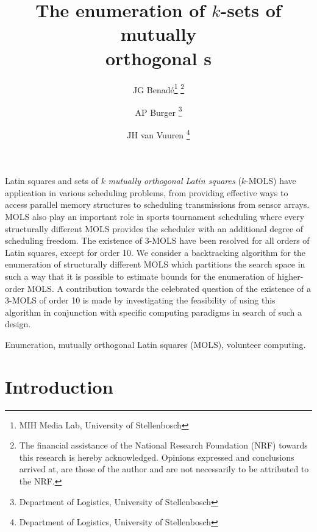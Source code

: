 \documentclass[11pt, a4paper]{article}
\title{The enumeration of $k$-sets of mutually\\ orthogonal  \lat s }
\author{JG Benad\'{e}\thanks{MIH Media Lab, University of Stellenbosch} \thanks{The financial assistance of the National Research Foundation (NRF) towards this research is hereby acknowledged. Opinions
expressed and conclusions arrived at, are those of the author and are not necessarily to be attributed to the NRF.} \and AP Burger \thanks{Department of Logistics, University of Stellenbosch} \and JH van Vuuren \thanks{Department of Logistics, University of Stellenbosch} }
\newcommand{\lat}{Latin square}
\newcounter{ls}
\begin{document}
\oriontitle
\begin{Abstract} 


\lat s and sets of $k$ \emph{mutually orthogonal \lat s} ($k$-MOLS) have  application in various scheduling problems, from providing effective ways to access parallel memory structures to scheduling transmissions from sensor arrays. MOLS  also play an important role in sports tournament scheduling where every structurally different MOLS provides the scheduler with an additional degree of scheduling freedom. The existence of $3$-MOLS have been resolved for all orders of \lat s, except for order 10. We consider a backtracking algorithm for the enumeration of structurally different MOLS which partitions the search space in such a way that it is possible to estimate bounds for the enumeration of higher-order MOLS. A contribution towards the celebrated question of the existence of a 3-MOLS of order 10 is made by investigating the feasibility of using this algorithm in conjunction with  specific computing paradigms in search of such a design. 
\end{Abstract}

\begin{keywords} 
Enumeration, mutually orthogonal \lat s (MOLS), volunteer computing. 
\end{keywords}

\section{Introduction}
\end{document}
